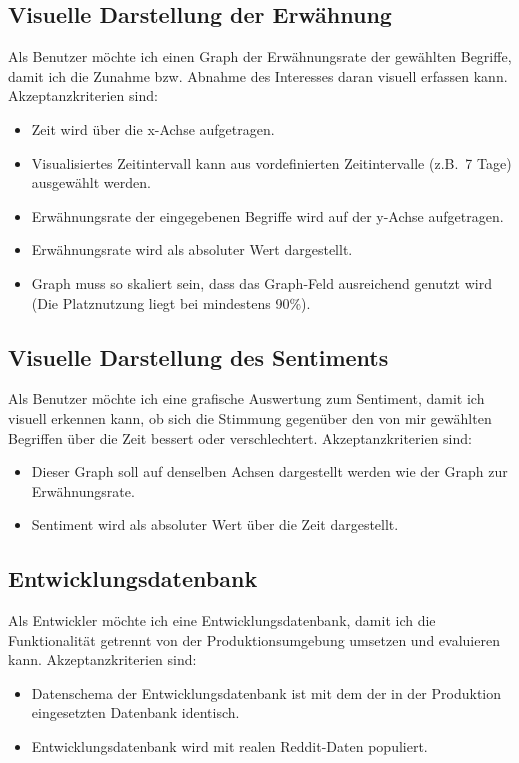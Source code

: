 \documentclass[a4paper, 10pt, conference]{IEEEtran}
\begin{document}
\subsection{Visuelle Darstellung der Erwähnung}

Als Benutzer möchte ich einen Graph der Erwähnungsrate der gewählten Begriffe, damit ich die Zunahme bzw. Abnahme des Interesses daran visuell erfassen kann. Akzeptanzkriterien sind:
\begin{itemize}
\item Zeit wird über die x-Achse aufgetragen.
\item Visualisiertes Zeitintervall kann aus vordefinierten Zeitintervalle (z.B.~7 Tage) ausgewählt werden.
\item Erwähnungsrate der eingegebenen Begriffe wird auf der y-Achse aufgetragen.
\item Erwähnungsrate wird als absoluter Wert dargestellt.
\item Graph muss so skaliert sein, dass das Graph-Feld ausreichend genutzt wird (Die Platznutzung liegt bei mindestens 90\%).
\end{itemize}

\subsection{Visuelle Darstellung des Sentiments}

Als Benutzer möchte ich eine grafische Auswertung zum Sentiment, damit ich visuell erkennen kann, ob sich die Stimmung gegenüber den von mir gewählten Begriffen über die Zeit bessert oder verschlechtert. Akzeptanzkriterien sind:
\begin{itemize}
\item Dieser Graph soll auf denselben Achsen dargestellt werden wie der Graph zur Erwähnungsrate.
\item Sentiment wird als absoluter Wert über die Zeit dargestellt.
\end{itemize}

\subsection{Entwicklungsdatenbank}

Als Entwickler möchte ich eine Entwicklungsdatenbank, damit ich die Funktionalität getrennt von der Produktionsumgebung umsetzen und evaluieren kann. Akzeptanzkriterien sind:
\begin{itemize}
\item Datenschema der Entwicklungsdatenbank ist mit dem der in der Produktion eingesetzten Datenbank identisch.
\item Entwicklungsdatenbank wird mit realen Reddit-Daten populiert.
\end{itemize}
\end{document}

